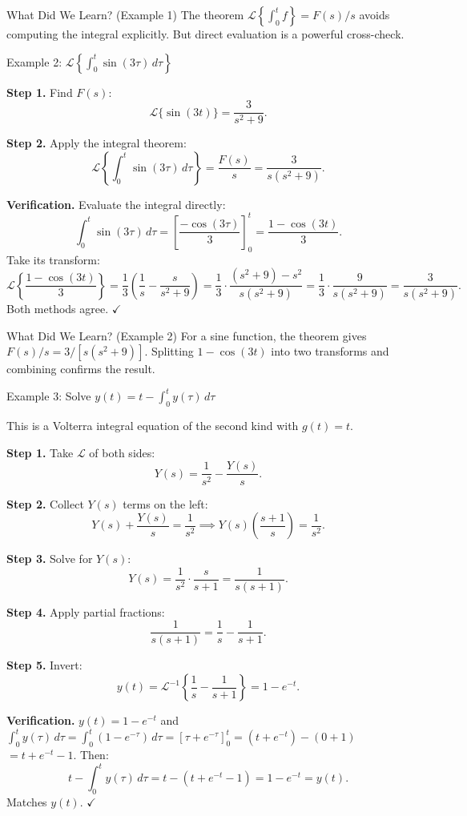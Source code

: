 \documentclass[12pt,a4paper]{article}
\begin{document}
\begin{learnbox}{What Did We Learn? (Example 1)}
The theorem $\mathcal{L}\!\left\{\int_0^t f\right\} = F(s)/s$ avoids computing the
integral explicitly. But direct evaluation is a powerful cross-check.
\end{learnbox}

\begin{infobox}{Example 2: $\mathcal{L}\!\left\{\int_0^t \sin(3\tau)\,d\tau\right\}$}

\textbf{Step 1.} Find $F(s)$:
\[
  \mathcal{L}\{\sin(3t)\} = \frac{3}{s^2 + 9}.
\]

\textbf{Step 2.} Apply the integral theorem:
\[
  \mathcal{L}\!\left\{\int_0^t \sin(3\tau)\,d\tau\right\} = \frac{F(s)}{s}
  = \frac{3}{s(s^2 + 9)}.
\]

\textbf{Verification.} Evaluate the integral directly:
\[
  \int_0^t \sin(3\tau)\,d\tau = \left[\frac{-\cos(3\tau)}{3}\right]_0^t
  = \frac{1 - \cos(3t)}{3}.
\]
Take its transform:
\[
  \mathcal{L}\!\left\{\frac{1 - \cos(3t)}{3}\right\}
  = \frac{1}{3}\left(\frac{1}{s} - \frac{s}{s^2+9}\right)
  = \frac{1}{3}\cdot\frac{(s^2+9) - s^2}{s(s^2+9)}
  = \frac{1}{3}\cdot\frac{9}{s(s^2+9)}
  = \frac{3}{s(s^2+9)}.
\]
Both methods agree. $\checkmark$
\end{infobox}

\begin{learnbox}{What Did We Learn? (Example 2)}
For a sine function, the theorem gives $F(s)/s = 3/[s(s^2+9)]$. Splitting
$1 - \cos(3t)$ into two transforms and combining confirms the result.
\end{learnbox}

\begin{infobox}{Example 3: Solve $y(t) = t - \int_{0}^{t} y(\tau)\,d\tau$}

This is a Volterra integral equation of the second kind with $g(t) = t$.

\textbf{Step 1.} Take $\mathcal{L}$ of both sides:
\[
  Y(s) = \frac{1}{s^2} - \frac{Y(s)}{s}.
\]

\textbf{Step 2.} Collect $Y(s)$ terms on the left:
\[
  Y(s) + \frac{Y(s)}{s} = \frac{1}{s^2}
  \implies Y(s)\!\left(\frac{s+1}{s}\right) = \frac{1}{s^2}.
\]

\textbf{Step 3.} Solve for $Y(s)$:
\[
  Y(s) = \frac{1}{s^2}\cdot\frac{s}{s+1} = \frac{1}{s(s+1)}.
\]

\textbf{Step 4.} Apply partial fractions:
\[
  \frac{1}{s(s+1)} = \frac{1}{s} - \frac{1}{s+1}.
\]

\textbf{Step 5.} Invert:
\[
  y(t) = \mathcal{L}^{-1}\!\left\{\frac{1}{s} - \frac{1}{s+1}\right\} = 1 - e^{-t}.
\]

\textbf{Verification.} $y(t) = 1 - e^{-t}$ and $\int_0^t y(\tau)\,d\tau
= \int_0^t (1 - e^{-\tau})\,d\tau = [\tau + e^{-\tau}]_0^t = (t + e^{-t}) - (0 + 1)$
$= t + e^{-t} - 1$. Then:
\[
  t - \int_0^t y(\tau)\,d\tau = t - (t + e^{-t} - 1) = 1 - e^{-t} = y(t).
\]
Matches $y(t)$. $\checkmark$
\end{infobox}
\end{document}

